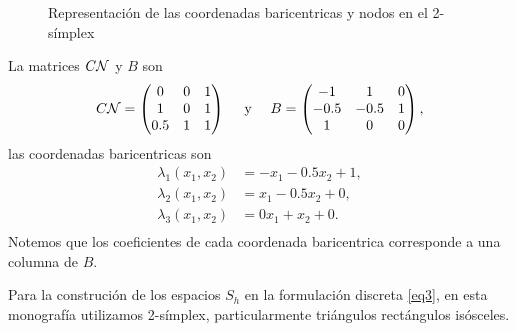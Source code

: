 \begin{ejemplo}
\begin{figure}[h!]
\begin{center}
\end{center}
\caption{Representaci\'on de las coordenadas baricentricas y nodos en el 2-s\'implex }
\setlength{\abovecaptionskip}{0pt}
\setlength{\belowcaptionskip}{0pt}
\end{figure}

La matrices $C{\mathcal{N}}$ y $B$ son 
\begin{equation*}
\begin{split}
C{\mathcal{N}}=\begin{pmatrix}
0 & 0 & 1\\
1 & 0 & 1 \\
0.5 & 1 & 1
\end{pmatrix}
\quad \text{ y }\quad B= \begin{pmatrix}
-1 & 1 & 0\\
-0.5 & -0.5 & 1 \\
1 & 0 & 0
\end{pmatrix},
\end{split}
\end{equation*}  
las coordenadas baricentricas son 
\begin{equation*}
\begin{split}
\lambda_{1}(x_{1},x_{2}) &= -x_{1} - 0.5x_{2} +1 ,  \\
\lambda_{2}(x_{1},x_{2}) &= x_{1} - 0.5x_{2} + 0 ,  \\
\lambda_{3}(x_{1},x_{2}) &= 0x_{1} + x_{2} + 0 .  \\
\end{split}
\end{equation*}
Notemos que los coeficientes de cada coordenada baricentrica corresponde a una columna de $B$.
\end{ejemplo}

Para la construci\'on de los espacios $S_{h}$ en la formulaci\'on discreta \eqref{eq3}, en esta monograf\'ia utilizamos 2-s\'implex, particularmente tri\'angulos rect\'angulos is\'osceles.


